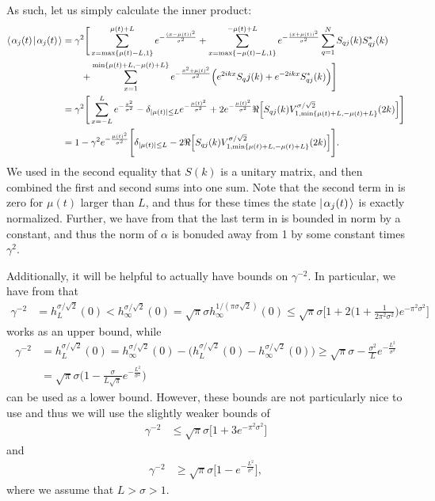 \documentclass[../thesis-main/thesis-main]{subfiles}
\begin{document}
As such, let us simply calculate the inner product:
\begin{align}
  \langle\mspace{2mu} \alpha_j(t) \mspace{2mu} | \mspace{2mu} \alpha_j(t)\mspace{2mu} \rangle 
  &= \gamma^2 \Bigg[\sum_{x=\max\{\mu(t)-L,1\}}^{\mu(t) + L} e^{-\frac{(x-\mu(t))^2}{\sigma^2}} + \sum_{x=\max\{-\mu(t) - L,1\}}^{-\mu(t)+L} e^{-\frac{(x+\mu(t))^2}{\sigma^2}} \sum_{q=1}^N S_{qj}(k)S^*_{qj}(k)\nonumber\\
  &\qquad  + \sum_{x=1}^{\min\{\mu(t)+L,-\mu(t) + L\}} e^{-\frac{x^2 + \mu(t)^2}{\sigma^2}} \Big(e^{2ikx} S_qj(k) + e^{-2ikx} S_{qj}^*(k) \Big) \Bigg] \\
  & = \gamma^2 \Bigg[ \sum_{x=-L}^L e^{-\frac{x^2}{\sigma^2}} - \delta_{|\mu(t)| \leq L} e^{-\frac{\mu(t)^2}{\sigma^2}}  + 2 e^{-\frac{\mu(t)^2}{\sigma^2}} \Re\Big[S_{qj}(k)V_{1,\min\{\mu(t) + L,-\mu(t) + L\}}^{\sigma/\sqrt{2}}(2k)\Big] \Bigg]\\
  &= 1 - \gamma^2 e^{-\frac{\mu(t)^2}{\sigma^2}} \Bigg[ \delta_{|\mu(t)| \leq L}   - 2 \Re\Big[S_{qj}(k)V_{1,\min\{\mu(t) + L,-\mu(t) + L\}}^{\sigma/\sqrt{2}}(2k)\Big] \Bigg].\label{eq:alpha_norm}
\end{align}
We used in the second equality that $S(k)$ is a unitary matrix, and then combined the first and second sums into one sum.  Note that the second term in  is zero for $\mu(t)$ larger than $L$, and thus for these times the state $|\mspace{2mu} \alpha_j(t) \mspace{2mu} \rangle$ is exactly normalized.  Further, we have from  that the last term in  is bounded in norm by a constant, and thus the norm of $\alpha$ is bonuded away from 1 by some constant times $\gamma^2$.

Additionally, it will be helpful to actually have bounds on $\gamma^{-2}$.  In particular, we have from  that 
\begin{align}
  \gamma^{-2} &= h_{L}^{\sigma/\sqrt{2}}(0)   < h_{\infty}^{\sigma/\sqrt{2}}(0)
     = \sqrt{\pi} \sigma h_{\infty}^{1/(\pi \sigma \sqrt{2})} (0)
     \leq \sqrt{\pi} \sigma \Big[ 1 + 2 \Big( 1 + \frac{1}{2\pi^2\sigma^2}\Big) e^{ - \pi^2\sigma^2}\Big]
\end{align}
works as an upper bound, while
\begin{align}
  \gamma^{-2} &= h_{L}^{\sigma/\sqrt{2}}(0) = h_{\infty}^{\sigma/\sqrt{2}}(0) - \big( h_{L}^{\sigma/\sqrt{2}}(0) - h_\infty^{\sigma/\sqrt{2}}(0)\big) \geq \sqrt{\pi} \sigma - \frac{\sigma^2}{L} e^{-\frac{L^2}{\sigma^2}} \\
   &= \sqrt{\pi} \sigma \Big(1 - \frac{\sigma}{L\sqrt{\pi}} e^{ - \frac{L^2}{\sigma^2}}\Big) 
\end{align}
can be used as a lower bound.  However, these bounds are not particularly nice to use and thus we will use the slightly weaker bounds of
\begin{align}
  \gamma^{-2} & \leq \sqrt{\pi}\sigma \big[ 1 + 3 e^{-\pi^2 \sigma^2}\big]\label{eq:gaussian_gamma_upper_bound}
\end{align}
and
\begin{align}
  \gamma^{-2} & \geq \sqrt{\pi} \sigma \big[ 1 - e^{-\frac{L^2}{\sigma^2}}\big],\label{eq:gaussian_gamma_lower_bound}
\end{align}
where we assume that $L > \sigma > 1$.
\end{document}
